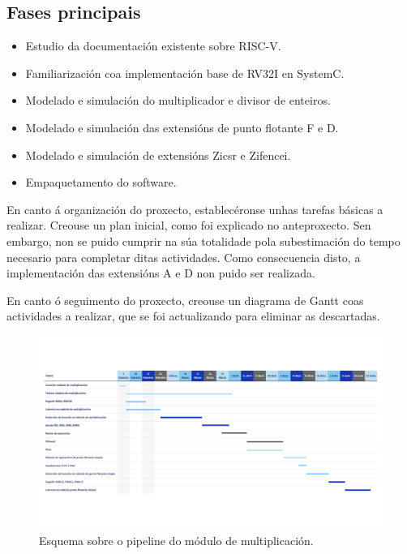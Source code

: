 \subsection{Fases principais}
\begin{itemize}
    \item Estudio da documentación existente sobre RISC-V.
    \item Familiarización coa implementación base de RV32I en SystemC. 
    \item Modelado e simulación do multiplicador e divisor de enteiros. 
    \item Modelado e simulación das extensións de punto flotante F e D. 
    \item Modelado e simulación de extensións Zicsr e  Zifencei.
    \item Empaquetamento do software. 

\end{itemize}

En canto á organización do proxecto, establecéronse unhas tarefas básicas a realizar. Creouse un plan inicial, como foi explicado no anteproxecto. Sen embargo, non se puido cumprir na súa totalidade pola subestimación do tempo necesario para completar ditas actividades. Como consecuencia disto, a implementación das extensións A e D non puido ser realizada. 

En canto ó seguimento do proxecto, creouse un diagrama de Gantt coas actividades a realizar, que se foi actualizando para eliminar as descartadas. 

\begin{figure}[hp!]
  \centering
  \includegraphics[width=\textwidth]{imaxes/Gantt - TFG.png}
  \caption{Esquema sobre o pipeline do módulo de multiplicación.}
  \label{fig:gantt}
\end{figure}

